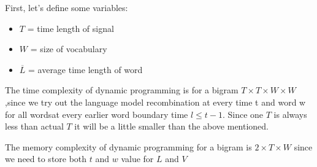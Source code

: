 First, let's define some variables: 
\begin{itemize}
	\item $T$ = time length of signal
	\item $W$ = size of vocabulary
	\item $\overline{L}$ = average time length of word
\end{itemize}

The time complexity of dynamic programming is for a bigram $T \times T \times W \times W$,since we try out the language model recombination at every time t and word w for all wordsat every earlier word boundary time $l \le t - 1$.
Since one $T$ is always less than actual $T$ it will be a little smaller than the 
above mentioned.

The memory complexity of dynamic programming for a bigram is $2 \times T \times W$ since 
we need to store both $t$ and $w$ value for $L$ and $V$

